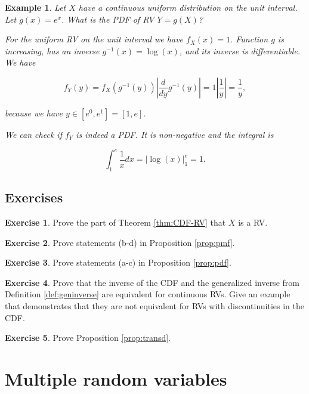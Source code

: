 \documentclass{book}
\theoremstyle{plain}%
\newtheorem{prototheorem}{Example}[section]
\newenvironment{cexample}
   {\colorlet{shadecolor}{gray!10}\begin{shaded}\begin{prototheorem}}
   {\end{prototheorem}\end{shaded}}
\theoremstyle{definition}
\newtheorem{exercise}{Exercise}[chapter]
\begin{document}
\begin{cexample}
Let $X$ have a continuous uniform distribution on the unit interval. Let $g(x) = e^x$. What is the PDF of RV $Y = g(X)$?

For the uniform RV on the unit interval we have $f_X(x) = 1$. Function $g$ is increasing, has an inverse $g^{-1}(x) = \log(x)$, and its inverse is differentiable. We have

$$f_Y(y) = f_X(g^{-1}(y)) |\frac{d}{dy}g^{-1}(y)| = 1 |\frac{1}{y}| = \frac{1}{y},$$

because we have $y \in [e^0, e^1] = [1, e]$.

We can check if $f_Y$ is indeed a PDF. It is non-negative and the integral is

$$\int_1^e \frac{1}{x} dx = |\log(x)|_{1}^e = 1.$$


\end{cexample}

\section*{Exercises}

\begin{exercise}
Prove the part of Theorem \ref{thm:CDF-RV} that $X$ is a RV.
\end{exercise}

\begin{exercise}
Prove statements (b-d) in Proposition \ref{prop:pmf}.
\end{exercise}

\begin{exercise}
Prove statements (a-c) in Proposition \ref{prop:pdf}.
\end{exercise}

\begin{exercise}
Prove that the inverse of the CDF and the generalized inverse from Definition \ref{def:geninverse} are equivalent for continuous RVs. Give an example that demonstrates that they are not equivalent for RVs with discontinuities in the CDF.
\end{exercise}

\begin{exercise}
Prove Proposition \ref{prop:transd}.
\end{exercise}



\chapter{Multiple random variables}
\end{document}
